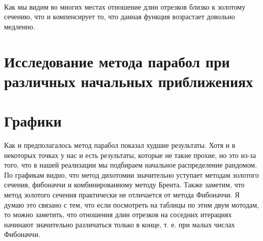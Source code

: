 
\ 

Как мы видим во многих местах отношение длин отрезков
близко к золотому сечению, что и компенсирует то, что данная
функция возрастает довольно медленно.

\section {Исследование метода парабол при различных начальных приближениях}



\section {Графики}



Как и предполагалось метод парабол показал худшие результаты.
Хотя и в некоторых точках у нас и есть результаты, которые
не такие прохие, но это из-за того, что в нашей реализации
мы подбираем начальное распределение рандомом.
По графикам видно, что метод дихотомии значительно уступает
методам золотого сечения, фибоначчи и комбинированному методу Брента.
Также заметим, что метод золотого сечения практически не отличается от метода
Фибоначчи. Я думаю это связано с тем, что если посмотреть на таблицы
по этим двум мотодам, то можно заметить, что отношения
длин отрезков на соседних итерациях начинают значительно различаться
только в конце, т. е. при малых числах Фибоначчи.

